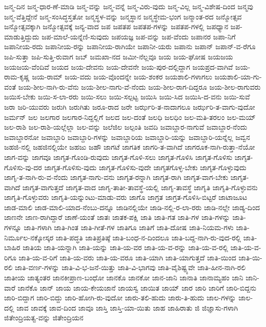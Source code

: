 {ಜನ್ಮ-ದಿನ
ಜನ್ಮ-ಧಾರ-ಣೆ-ಮಾಡಿ
ಜನ್ಮ-ವನ್ನು
ಜನ್ಮ-ವನ್ನೆ
ಜನ್ಮ-ವಿರು-ವುದು
ಜನ್ಮ-ವಿಲ್ಲ
ಜನ್ಮ-ವಿಶೇಷ-ದಿಂದ
ಜನ್ಮವು
ಜನ್ಮ-ವೆತ್ತಿದ್ದೇನೆ
ಜನ್ಮ-ಸಂಸಿದ್ಧಸ್ತತೋ
ಜನ್ಮಸ್ಥಳ-ವನ್ನು
ಜನ್ಮಸ್ಥಾನ
ಜನ್ಮಸ್ಥೇಮ-ಭಂಗ
ಜನ್ಮಾಂತ-ರದ
ಜನ್ಮೋತ್ಸವ
ಜನ್ಮೋತ್ಸವಕ್ಕಾಗಿ
ಜನ್ಮೋತ್ಸವಕ್ಕೆ
ಜನ್ಯ-ವಾದ
ಜಪ
ಜಪತಪ
ಜಪತಪ-ಗಳನ್ನು
ಜಪತಪ-ಗಳಲ್ಲಿ
ಜಪಧ್ಯಾನ
ಜಪ-ಮಾಡುತ್ತಿದ್ದುದು
ಜಪ-ಮಾಲೆ-ಯನ್ನೆಣಿ-ಸುವುದು
ಜಪಯಜ್ಞ
ಜಪ-ವನ್ನು
ಜಪ-ವೆಂದು
ಜಪಾನರ
ಜಪಾ-ನಿಗೆ
ಜಪಾನೀಯ-ರದು
ಜಪಾನೀಯ-ರನ್ನು
ಜಪಾನೀಯ-ರಾಗಿಯೇ
ಜಪಾನೀ-ಯರು
ಜಪಾನು
ಜಪಾನ್
ಜಪಾನ್-ವ-ರೆಗೂ
ಜಪಿ-ಸುತ್ತಾ
ಜಪಿ-ಸುತ್ತಿ-ರುವಾಗ
ಜಬ್
ಜಮಖಾ-ನದ
ಜಮೀ-ನೆಲ್ಲವೂ
ಜಯ
ಜಯ-ಘೋಷ
ಜಯಜಯ
ಜಯಜಯ-ವೆಂದಿವೆ
ಜಯದ
ಜಯ-ದೇವನು
ಜಯ-ದೇವನೇ
ಜಯ-ಪುರ-ದಲ್ಲಿದ್ದಾಗ
ಜಯಪ್ರದ-ವಾಗಿವೆ
ಜಯ-ರಾಮ-ಕೃಷ್ಣ
ಜಯ-ರಾಮ್
ಜಯ-ವದು
ಜಯ-ವೊಂದನ್ನೇ
ಜಯ-ಶಂಕರ
ಜಯಶಾಲಿ-ಗಳಾಗಲು
ಜಯಶಾಲಿ-ಯಾ-ಗು-ವಂತೆ
ಜಯ-ಶೀಲ-ನಾಗಿ-ರು-ವೆನು
ಜಯ-ಶೀಲ-ನಾಗು-ವೆ-ನೆಂದು
ಜಯ-ಶೀಲ-ರಾಗ-ದಿದ್ದರೂ
ಜಯ-ಶೀಲ-ರಾಗುವರು
ಜಯಿಸ-ಬೇಕು
ಜಯಿ-ಸ-ಲಾ-ರರು
ಜಯಿ-ಸಲು
ಜಯಿ-ಸಲ್ಪಟ್ಟ
ಜಯಿಸಿ
ಜಯಿ-ಸಿದ
ಜಯಿಸಿ-ದ-ವನು
ಜಯಿ-ಸುವೆ
ಜರಾ
ಜರಿ-ಯುವರು
ಜರುಗಿ
ಜರುಗಿತು
ಜರೂ-ರಾದ
ಜರೇ
ಜರ್ಝರಿ-ತ-ನಾದಾಗಲೂ
ಜರ್ಝರಿ-ತ-ವಾಗು-ವುದೋ
ಜರ್ಮನ್
ಜಲ
ಜಲಗಾರ
ಜಲಗಾರ-ನಿದ್ದಲ್ಲಿಗೆ
ಜಲದ
ಜಲ-ದಂತೆ
ಜಲಧಿ
ಜಲಧಿಂ
ಜಲ-ಮತಿ-ತರಲಂ
ಜಲ-ಮಯ್
ಜಲ-ರಾಶಿ
ಜಲ-ರಾಶಿ-ಯಲ್ಲೆಲ್ಲಾ
ಜಲ-ವನ್ನು
ಜಲೆಜಿಲ
ಜಲ್ಪಂತಿ
ಜವದಿ
ಜವಾಬ್ದಾರ-ನಾಗುವೆ
ಜವಾಬ್ದಾರ-ನೆಂದು
ಜವಾಬ್ದಾರನೋ
ಜವಾಬ್ದಾರಿ
ಜವಾಬ್ದಾರಿ-ಗಳನ್ನು
ಜವಾಬ್ದಾರಿಯ
ಜವಾಬ್ದಾರಿ-ಯನ್ನು
ಜವಾಬ್ದಾರಿ-ಯನ್ನೆಲ್ಲ
ಜವ್ವನ
ಜಹಜಿ-ನಲ್ಲಿ
ಜಹಜಿನಲ್ಲಿಯೇ
ಜಹಜು
ಜಹೌ
ಜಾಗಟೆ
ಜಾಗತಿಕ
ಜಾಗರಿ-ತ-ವಾಗಿದೆ
ಜಾಗರೂಕ-ನಾಗಿ-ರುತ್ತಾ-ನೆಯೋ
ಜಾಗ-ವನ್ನು
ಜಾಗವೂ
ಜಾಗೃತ-ಗೊಂಡಿ-ರುವುದು
ಜಾಗೃತ-ಗೊಳಿ-ಸಲು
ಜಾಗೃತ-ಗೊಳಿಸಿ
ಜಾಗೃತ-ಗೊಳಿಸು
ಜಾಗೃತ-ಗೊಳಿಸು-ವು-ದರ
ಜಾಗೃತ-ಗೊಳಿಸು-ವುದು
ಜಾಗೃತ-ಗೊಳಿಸು-ವುದೇ
ಜಾಗೃತಗೊಳ್ಳ-ಬೇಕು
ಜಾಗೃತ-ಗೊಳ್ಳುವುದು
ಜಾಗೃ-ತ-ನಾಗಿ-ರು-ವ-ನೆಂದು
ಜಾಗೃತ-ನಾಗು-ವನು
ಜಾಗೃತ-ರನ್ನಾಗಿ
ಜಾಗೃತ-ರಾಗಿ
ಜಾಗೃತ-ವಾಗ-ಬೇಕು
ಜಾಗೃತ-ವಾಗಿದೆ
ಜಾಗೃತ-ವಾಗುತ್ತದೆ
ಜಾಗೃತ-ವಾದ
ಜಾಗೃ-ತಾತೀ-ತಾವಸ್ಥೆ-ಯಲ್ಲಿ
ಜಾಗೃ-ತಾವಸ್ಥೆ
ಜಾಗೃತಿ
ಜಾಗೃತಿ-ಗೊಳ್ಳುವನು
ಜಾಗೃತಿ-ಗೊಳ್ಳುವರು
ಜಾಗೃತಿ-ಯನ್ನುಂಟು-ಮಾಡು-ವರು
ಜಾಗೊ
ಜಾಗ್ರತ
ಜಾಗ್ರತ-ಗೊಳಿಸಿ-ಬಿಟ್ಟರೆ
ಜಾಟಾಜೂಟ
ಜಾಡ-ಮಾಲಿ
ಜಾಡ-ಮಾಲಿ-ಯಾದ-ನೆಂಬು-ದನ್ನೂ
ಜಾಡಿನಲ್ಲಿಯೇ
ಜಾಡಿ-ನಲ್ಲಿ-ರ-ಲಾ-ರರು
ಜಾಡಿ-ನಲ್ಲೇ
ಜಾಡ್ಯ-ದಿಂದ
ಜಾಣನೇ
ಜಾಣ-ರಾಗಿದ್ದಾರೆ
ಜಾಣೆ-ಯಂತೆ
ಜಾತಃ
ಜಾತಕ-ಪಕ್ಷಿ
ಜಾತಿ
ಜಾತಿ-ಗತ
ಜಾತಿ-ಗಳ
ಜಾತಿ-ಗಳನ್ನು
ಜಾತಿ-ಗಳನ್ನೂ
ಜಾತಿ-ಗಳಾಗಿ
ಜಾತಿ-ಗಿಂತ
ಜಾತಿ-ಗೀತೆ-ಗಳ
ಜಾತಿಗೂ
ಜಾತಿಗೆ
ಜಾತಿ-ದೋಷ
ಜಾತಿ-ನಿಯಮ-ಗಳು
ಜಾತಿ-ನಿರ್ಮೂಲ-ನಕ್ಕೋಸ್ಕರ
ಜಾತಿ-ಪದ್ಧತಿ
ಜಾತಿಪ್ರತಿಷ್ಠೆ
ಜಾತಿ-ಬಂಧ-ನ-ದಿಂದಲೂ
ಜಾತಿ-ಬದ್ದ-ನಾಗಿ-ರು-ವುದ-ರಲ್ಲಿ
ಜಾತಿ-ಬಾಹಿರ
ಜಾತಿಯ
ಜಾತಿ-ಯನ್ನಾಗಿ
ಜಾತಿ-ಯನ್ನು
ಜಾತಿ-ಯ-ವರ
ಜಾತಿ-ಯ-ವ-ರನ್ನು
ಜಾತಿ-ಯ-ವ-ರಲ್ಲಿ
ಜಾತಿ-ಯ-ವ-ರಿಗೂ
ಜಾತಿ-ಯ-ವ-ರಿಗೆ
ಜಾತಿ-ಯ-ವರು
ಜಾತಿ-ಯ-ವರೂ
ಜಾತಿ-ಯಾಗಿ
ಜಾತಿ-ಯಾಗುತ್ತದೆ
ಜಾತಿ-ಯಿಂದ
ಜಾತಿ-ಯಿ-ರಲಿ
ಜಾತಿ-ವರ್ಣ-ಗಳನ್ನು
ಜಾತಿ-ವಿ-ಭ-ಜನೆ-ಯಿತ್ತು
ಜಾತಿ-ವಿ-ಭಾಗವು
ಜಾತಿ-ವೈಶಿಷ್ಟ್ಯವೇ
ಜಾತಿ-ಹೀನ-ನಾಗಿ-ರಲಿ
ಜಾತೀಯ
ಜಾತ್ಯಂತರ
ಜಾನಕೀಪ್ರಾಣ-ಬಂಧೋ
ಜಾನಕೊ
ಜಾನಕೋ
ಜಾನ-ಜಾನಿ
ಜಾನಾತಿ
ಜಾನಾಮ್ಯಹಂ
ಜಾನಿ
ಜಾನಿ-ವಾರೆ
ಜಾನೆಕೊ
ಜಾನ್
ಜಾಯ
ಜಾಯ-ಕೇಯಜಾನೆ
ಜಾಯಸ್ವ
ಜಾಯಿತ
ಜಾಯ್
ಜಾರ
ಜಾರಿ
ಜಾರಿಗೆ
ಜಾರಿ-ಬಿದ್ದನು
ಜಾರಿ-ಬಿದ್ದಾಗ
ಜಾರಿ-ಬಿದ್ದು
ಜಾರಿ-ಹೋಗಿ-ರು-ವುದೋ
ಜಾರು-ತಲಿ-ಹುದು
ಜಾರು-ತಿ-ಹುದು
ಜಾಲ-ಗಳನ್ನು
ಜಾಲ-ದಲ್ಲಿ
ಜಾವ
ಜಾವಕ್ಕೆ
ಜಾವ-ದಿಂದ
ಜಾವೂ
ಜಾಸ್ತಿ
ಜಾಸ್ತಿ-ಯಾ-ಯಿತು
ಜಾಹ
ಜಾಹಿರಾತು
ಜಿ
ಜಿಜ್ಞಾಸು-ಗಳಾಗಿ
ಜಿತೇಂದ್ರಿಯತ್ವ-ವನ್ನು
ಜಿತೇಂದ್ರಿಯನ
}
